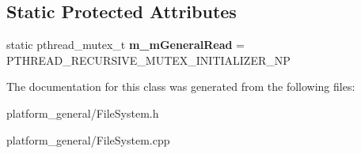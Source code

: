 \subsection*{\-Static \-Protected \-Attributes}
\begin{DoxyCompactItemize}
\item 
\hypertarget{classgeneral__server_1_1IOFile_a3bbd4d983d7c031a4fd39cb5e6952c86}{static pthread\-\_\-mutex\-\_\-t {\bfseries m\-\_\-m\-General\-Read} = \-P\-T\-H\-R\-E\-A\-D\-\_\-\-R\-E\-C\-U\-R\-S\-I\-V\-E\-\_\-\-M\-U\-T\-E\-X\-\_\-\-I\-N\-I\-T\-I\-A\-L\-I\-Z\-E\-R\-\_\-\-N\-P}\label{classgeneral__server_1_1IOFile_a3bbd4d983d7c031a4fd39cb5e6952c86}

\end{DoxyCompactItemize}


\-The documentation for this class was generated from the following files\-:\begin{DoxyCompactItemize}
\item 
platform\-\_\-general/\-File\-System.\-h\item 
platform\-\_\-general/\-File\-System.\-cpp\end{DoxyCompactItemize}
